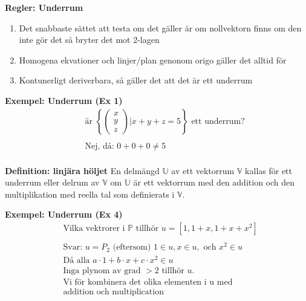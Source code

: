 \begin{multicols}{2}
\textbf{Regler: Underrum}
\begin{enumerate}
  \item Det snabbaste sättet att testa om det gäller är om nollvektorn finns
  om den inte gör det så bryter det mot 2-lagen
  \item Homogena ekvationer och linjer/plan genonom origo gäller det alltid för
  \item Kontunerligt deriverbara, så gäller det att det är ett underrum
\end{enumerate}

\textbf{Exempel: Underrum (Ex 1)}
\begin{align*}
  &\quad  \text{är } \left\{ \begin{pmatrix} x \\ y \\ z \end{pmatrix} | x+y+z=5 \right\}
  \text{ ett underrum?} \\
  &\quad  \\
  &\quad  \text{Nej, då: } 0+0+0\neq5 \\
\end{align*} %


\textbf{Definition: linjära höljet}
En delmängd $\mathbb{U}$ av ett vektorrum $\mathbb{V}$ kallas för
ett underrum eller delrum av $\mathbb{V}$ om $\mathbb{U}$ är ett vektorrum
med den addition och den multiplikation med reella tal som definierats i
$\mathbb{V}$.

\textbf{Exempel: Underrum (Ex 4)}
\begin{align*}
  &\text{Vilka vektrorer i $\mathbb{P}$ tillhör } u=[1, 1+x, 1+x+x^2] \\
  &\\
  &\text{Svar: } u=P_2 \text{ (eftersom) } 1\in{u}, x\in{u}, \text{ och } x^2\in{u} \\
  &\text{Då alla } a\cdot{1} + b\cdot{x} + c\cdot{x^2} \in{u} \\
  &\text{Inga plynom av grad $>2$ tillhör $u$.} \\
  &\text{Vi för kombinera det olika elementen i u med} \\
  &\text{addition och multiplication} \\
\end{align*}


\end{multicols}
